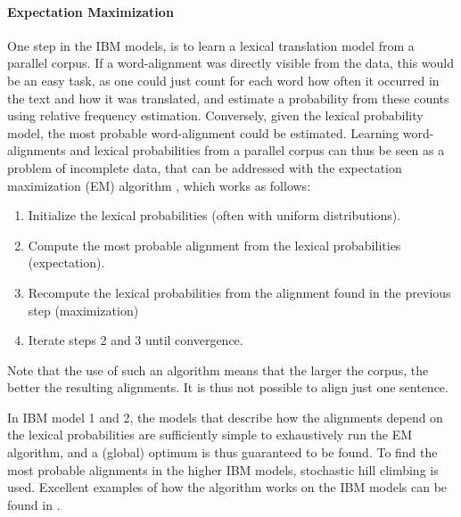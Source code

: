 \documentclass{report}
\begin{document}
\paragraph{Expectation Maximization}
One step in the IBM models, is to learn a lexical translation model from a parallel corpus. If a word-alignment was directly visible from the data, this would be an easy task, as one could just count for each word how often it occurred in the text and how it was translated, and estimate a probability from these counts using relative frequency estimation. Conversely, given the lexical probability model, the most probable word-alignment could be estimated. Learning word-alignments and lexical probabilities from a parallel corpus can thus be seen as a problem of incomplete data, that can be addressed with the expectation maximization (EM) algorithm \citep{dempster1977maximum}, which works as follows:\begin{enumerate}
\item Initialize the lexical probabilities (often with uniform distributions).
\item Compute the most probable alignment from the lexical probabilities (expectation).
\item Recompute the lexical probabilities from the alignment found in the previous step (maximization)
\item Iterate steps 2 and 3 until convergence.
\end{enumerate}

\noindent Note that the use of such an algorithm means that the larger the corpus, the better the resulting alignments. It is thus not possible to align just one sentence.

In IBM model 1 and 2, the models that describe how the alignments depend on the lexical probabilities are sufficiently simple to exhaustively run the EM algorithm, and a (global) optimum is thus guaranteed to be found. To find the most probable alignments in the higher IBM models, stochastic hill climbing is used. Excellent examples of how the algorithm works on the IBM models can be found in \cite[p88-113]{koehn2008statistical}.
\end{document}
